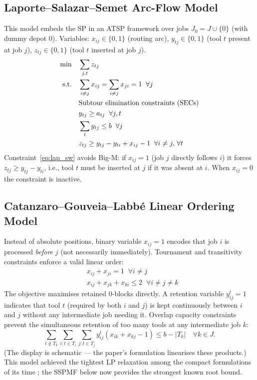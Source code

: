 \documentclass[11pt,a4paper]{article}
\theoremstyle{plain}
\theoremstyle{definition}
\begin{document}
\subsection{Laporte--Salazar--Semet Arc-Flow Model \cite{Laporte2004}}

This model embeds the SP in an ATSP framework over jobs $J_0 = J \cup \{0\}$
(with dummy depot 0). Variables: $x_{ij} \in \{0,1\}$ (routing arc),
$y_{tj} \in \{0,1\}$ (tool $t$ present at job $j$),
$z_{tj} \in \{0,1\}$ (tool $t$ inserted at job $j$).
\begin{align}
\min \quad & \sum_{j,t} z_{tj} \notag\\
\text{s.t.}\quad
& \sum_{i \ne j} x_{ij} = \sum_{i \ne j} x_{ji} = 1 \;\;\forall j \label{eq:lap_deg}\\
& \text{Subtour elimination constraints (SECs)} \notag\\
& y_{tj} \ge a_{tj} \;\;\forall j,t \label{eq:lap_cov}\\
& \sum_t y_{tj} \le b \;\;\forall j \label{eq:lap_cap}\\
& z_{tj} \ge y_{tj} - y_{ti} + x_{ij} - 1
  \;\;\forall i \ne j,\, \forall t \label{eq:lap_sw}
\end{align}
Constraint~\eqref{eq:lap_sw} avoids Big-M: if $x_{ij}=1$ (job $j$ directly
follows $i$) it forces $z_{tj} \ge y_{tj} - y_{ti}$,
i.e., tool $t$ must be inserted at $j$ if it was absent at $i$.
When $x_{ij}=0$ the constraint is inactive.

\subsection{Catanzaro--Gouveia--Labbé Linear Ordering Model \cite{Catanzaro2015}}

Instead of absolute positions, binary variable $x_{ij}=1$ encodes that job $i$
is processed \emph{before} $j$ (not necessarily immediately). Tournament and
transitivity constraints enforce a valid linear order:
\begin{align}
& x_{ij} + x_{ji} = 1 \;\;\forall i \ne j \label{eq:cat_tourn}\\
& x_{ij} + x_{jk} + x_{ki} \le 2 \;\;\forall i \ne j \ne k \label{eq:cat_trans}
\end{align}
The objective maximises retained 0-blocks directly. A retention variable
$y^t_{ij}=1$ indicates that tool $t$ (required by both $i$ and $j$) is kept
continuously between $i$ and $j$ without any intermediate job needing it.
Overlap capacity constraints prevent the simultaneous retention of too many
tools at any intermediate job $k$:
\[
  \sum_{t \notin T_k}\sum_{i : t \in T_i}\sum_{j : t \in T_j}
  y^t_{ij}(x_{ik}+x_{kj}-1) \le b - |T_k|
  \quad \forall k \in J.
\]
(The display is schematic --- the paper's formulation linearises these products.)
This model achieved the tightest LP relaxation among the compact formulations of
its time \cite{Catanzaro2015}; the SSPMF below now provides the strongest known
root bound.
\end{document}
